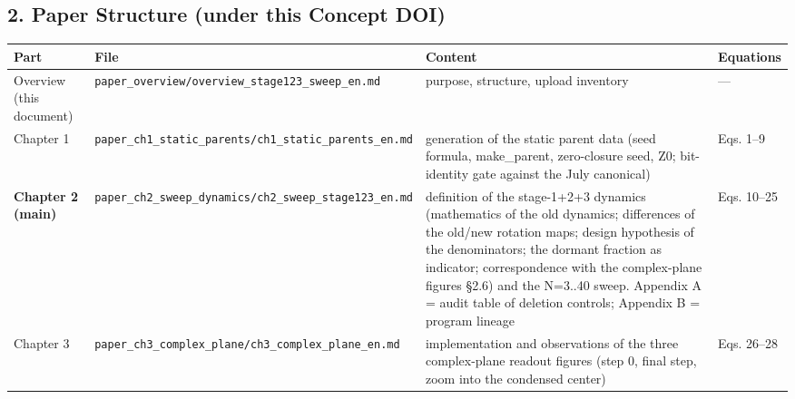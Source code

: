 \documentclass[
  a4paper,
]{ltjsarticle}
\newcounter{none} %
\begin{document}
\subsection{2. Paper Structure (under this Concept
DOI)}\label{paper-structure-under-this-concept-doi}

{\def\LTcaptype{none} %
\begin{longtable}[]{@{}
  >{\raggedright\arraybackslash}p{}
  >{\raggedright\arraybackslash}p{}
  >{\raggedright\arraybackslash}p{}
  >{\raggedright\arraybackslash}p{}@{}}
\toprule\noalign{}
\begin{minipage}[b]{\linewidth}\raggedright
Part
\end{minipage} & \begin{minipage}[b]{\linewidth}\raggedright
File
\end{minipage} & \begin{minipage}[b]{\linewidth}\raggedright
Content
\end{minipage} & \begin{minipage}[b]{\linewidth}\raggedright
Equations
\end{minipage} \\
\midrule\noalign{}
\endhead
\bottomrule\noalign{}
\endlastfoot
Overview (this document) &
\texttt{paper\_overview/overview\_stage123\_sweep\_en.md} & purpose,
structure, upload inventory & --- \\
Chapter 1 &
\texttt{paper\_ch1\_static\_parents/ch1\_static\_parents\_en.md} &
generation of the static parent data (seed formula, make\_parent,
zero-closure seed, Z0; bit-identity gate against the July canonical) &
Eqs. 1--9 \\
\textbf{Chapter 2 (main)} &
\texttt{paper\_ch2\_sweep\_dynamics/ch2\_sweep\_stage123\_en.md} &
definition of the stage-1+2+3 dynamics (mathematics of the old dynamics;
differences of the old/new rotation maps; design hypothesis of the
denominators; the dormant fraction as indicator; correspondence with the
complex-plane figures §2.6) and the N=3..40 sweep. Appendix A = audit
table of deletion controls; Appendix B = program lineage & Eqs.
10--25 \\
Chapter 3 &
\texttt{paper\_ch3\_complex\_plane/ch3\_complex\_plane\_en.md} &
implementation and observations of the three complex-plane readout
figures (step 0, final step, zoom into the condensed center) & Eqs.
26--28 \\
\end{longtable}
}
\end{document}
